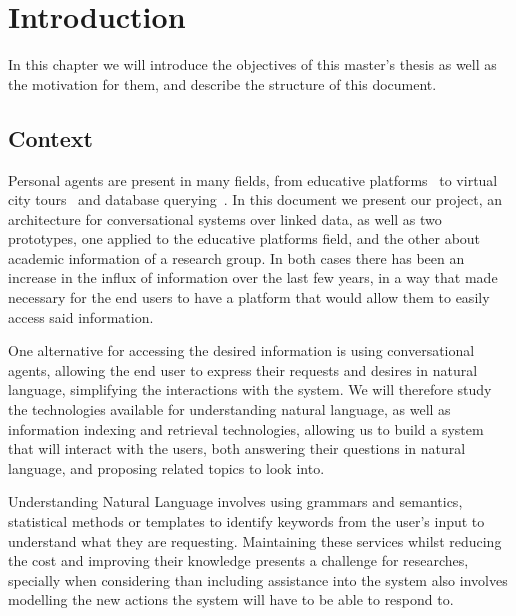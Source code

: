 \chapter{Introduction}
\label{chapter:intro}

\begin{chapterintro}

In this chapter we will introduce the objectives of this master's thesis as well as the motivation for them, and describe the structure of this document.
 
\end{chapterintro}

\cleardoublepage

\section{Context}

Personal agents are present in many fields, from educative platforms~\cite{fonte2012intelligent} to virtual city tours~\cite{bogdanovych2012the} and database querying~\cite{augello2009semantic}. In this document we present our project, an architecture for conversational systems over linked data, as well as two prototypes, one applied to the educative platforms field, and the other about academic information of a research group. In both cases there has been an increase in the influx of information over the last few years, in a way that made necessary for the end users to have a platform that would allow them to easily access said information.

One alternative for accessing the desired information is using conversational agents, allowing the end user to express their requests and desires in natural language, simplifying the interactions with the system. We will therefore study the technologies available for understanding natural language, as well as information indexing and retrieval technologies, allowing us to build a system that will interact with the users, both answering their questions in natural language, and proposing related topics to look into.

Understanding Natural Language involves using grammars and semantics, statistical methods or templates to identify keywords from the user's input to understand what they are requesting. Maintaining these services whilst reducing the cost and improving their knowledge presents a challenge for researches, specially when considering than including assistance into the system also involves modelling the new actions the system will have to be able to respond to.


